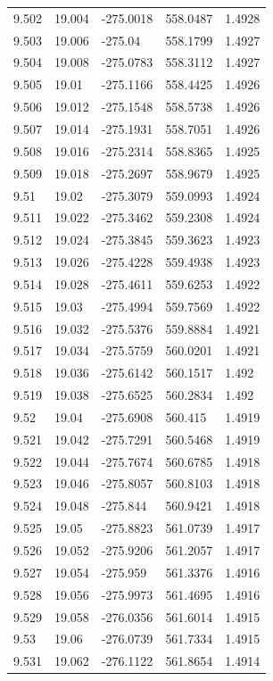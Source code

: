 \begin{tabular}{lllll}
9.502 & 19.004 & -275.0018 & 558.0487 & 1.4928 \\
9.503 & 19.006 & -275.04 & 558.1799 & 1.4927 \\
9.504 & 19.008 & -275.0783 & 558.3112 & 1.4927 \\
9.505 & 19.01 & -275.1166 & 558.4425 & 1.4926 \\
9.506 & 19.012 & -275.1548 & 558.5738 & 1.4926 \\
9.507 & 19.014 & -275.1931 & 558.7051 & 1.4926 \\
9.508 & 19.016 & -275.2314 & 558.8365 & 1.4925 \\
9.509 & 19.018 & -275.2697 & 558.9679 & 1.4925 \\
9.51 & 19.02 & -275.3079 & 559.0993 & 1.4924 \\
9.511 & 19.022 & -275.3462 & 559.2308 & 1.4924 \\
9.512 & 19.024 & -275.3845 & 559.3623 & 1.4923 \\
9.513 & 19.026 & -275.4228 & 559.4938 & 1.4923 \\
9.514 & 19.028 & -275.4611 & 559.6253 & 1.4922 \\
9.515 & 19.03 & -275.4994 & 559.7569 & 1.4922 \\
9.516 & 19.032 & -275.5376 & 559.8884 & 1.4921 \\
9.517 & 19.034 & -275.5759 & 560.0201 & 1.4921 \\
9.518 & 19.036 & -275.6142 & 560.1517 & 1.492 \\
9.519 & 19.038 & -275.6525 & 560.2834 & 1.492 \\
9.52 & 19.04 & -275.6908 & 560.415 & 1.4919 \\
9.521 & 19.042 & -275.7291 & 560.5468 & 1.4919 \\
9.522 & 19.044 & -275.7674 & 560.6785 & 1.4918 \\
9.523 & 19.046 & -275.8057 & 560.8103 & 1.4918 \\
9.524 & 19.048 & -275.844 & 560.9421 & 1.4918 \\
9.525 & 19.05 & -275.8823 & 561.0739 & 1.4917 \\
9.526 & 19.052 & -275.9206 & 561.2057 & 1.4917 \\
9.527 & 19.054 & -275.959 & 561.3376 & 1.4916 \\
9.528 & 19.056 & -275.9973 & 561.4695 & 1.4916 \\
9.529 & 19.058 & -276.0356 & 561.6014 & 1.4915 \\
9.53 & 19.06 & -276.0739 & 561.7334 & 1.4915 \\
9.531 & 19.062 & -276.1122 & 561.8654 & 1.4914 \\

\end{tabular}
